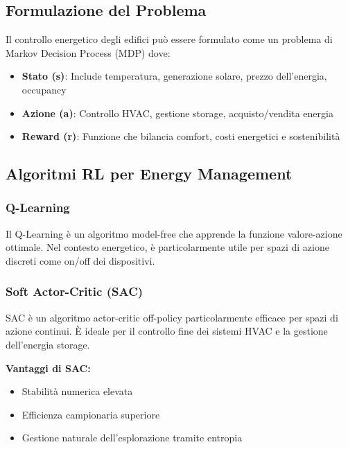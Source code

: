 \documentclass[12pt,a4paper,twoside]{report}
\begin{document}
\subsection{Formulazione del Problema}

Il controllo energetico degli edifici può essere formulato come un problema di Markov Decision Process (MDP) dove:

\begin{itemize}
    \item \textbf{Stato (s)}: Include temperatura, generazione solare, prezzo dell'energia, occupancy
    \item \textbf{Azione (a)}: Controllo HVAC, gestione storage, acquisto/vendita energia
    \item \textbf{Reward (r)}: Funzione che bilancia comfort, costi energetici e sostenibilità
\end{itemize}

\subsection{Algoritmi RL per Energy Management}

\subsubsection{Q-Learning}

Il Q-Learning \cite{watkins1992q} è un algoritmo model-free che apprende la funzione valore-azione ottimale. Nel contesto energetico, è particolarmente utile per spazi di azione discreti come on/off dei dispositivi.

\subsubsection{Soft Actor-Critic (SAC)}

SAC \cite{haarnoja2018sac} è un algoritmo actor-critic off-policy particolarmente efficace per spazi di azione continui. È ideale per il controllo fine dei sistemi HVAC e la gestione dell'energia storage.

\textbf{Vantaggi di SAC:}
\begin{itemize}
    \item Stabilità numerica elevata
    \item Efficienza campionaria superiore
    \item Gestione naturale dell'esplorazione tramite entropia
\end{itemize}
\end{document}
